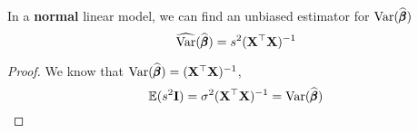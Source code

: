     \begin{Thm}
        In a \textbf{normal} linear model, we can find an unbiased estimator for $\text{Var}(\widehat{\pmb{\beta}})$
        \begin{equation}
            \widehat{\text{Var}}(\widehat{\pmb{\beta}}) = s^2 (\mathbf{X}^{\top}\mathbf{X})^{-1}
        \end{equation}
        \begin{proof}
            We know that $\text{Var}(\widehat{\pmb{\beta}}) = (\mathbf{X}^{\top}\mathbf{X})^{-1}$,
            \begin{equation}
                \mathbb{E}(s^2 \mathbf{I}) =  \sigma^2 (\mathbf{X}^{\top}\mathbf{X})^{-1} = \text{Var}(\widehat{\pmb{\beta}})
            \end{equation}
        \end{proof}
    \end{Thm}
